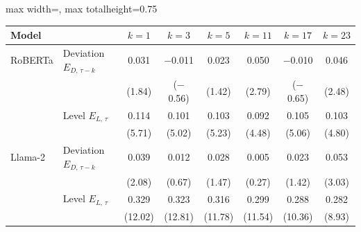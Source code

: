 \begin{table}[htbp]
{\footnotesize
\begin{adjustbox}{max width=\linewidth, max totalheight=0.75\textheight}
\begin{tabular}{llcccccc}
\toprule
Model &  & $k=1$ & $k=3$ & $k=5$ & $k=11$ & $k=17$ & $k=23$ \\
\midrule
RoBERTa & Deviation $E_{D,\,\tau-k}$ & \phantom{(0}0.031\phantom{)} & \phantom{(0}$-$0.011\phantom{)} & \phantom{(0}0.023\phantom{)} & \phantom{(0}0.050\phantom{)} & \phantom{(0}$-$0.010\phantom{)} & \phantom{(}0.046\phantom{)} \\
 &  & \phantom{0}(1.84)\phantom{0} & \phantom{0}($-$0.56)\phantom{0} & \phantom{0}(1.42)\phantom{0} & \phantom{0}(2.79)\phantom{0} & \phantom{0}($-$0.65)\phantom{0} & (2.48)\phantom{0} \\
 & Level $E_{L,\,\tau}$ & \phantom{(0}0.114\phantom{)} & \phantom{$-$(0}0.101\phantom{)} & \phantom{(0}0.103\phantom{)} & \phantom{(0}0.092\phantom{)} & \phantom{$-$(0}0.105\phantom{)} & \phantom{(}0.103\phantom{)} \\
 &  & \phantom{0}(5.71)\phantom{0} & \phantom{$-$0}(5.02)\phantom{0} & \phantom{0}(5.23)\phantom{0} & \phantom{0}(4.48)\phantom{0} & \phantom{$-$0}(5.06)\phantom{0} & (4.80)\phantom{0} \\
\midrule
Llama-2 & Deviation $E_{D,\,\tau-k}$ & \phantom{(0}0.039\phantom{)} & \phantom{$-$(0}0.012\phantom{)} & \phantom{(0}0.028\phantom{)} & \phantom{(0}0.005\phantom{)} & \phantom{$-$(0}0.023\phantom{)} & \phantom{(}0.053\phantom{)} \\
 &  & \phantom{0}(2.08)\phantom{0} & \phantom{$-$0}(0.67)\phantom{0} & \phantom{0}(1.47)\phantom{0} & \phantom{0}(0.27)\phantom{0} & \phantom{$-$0}(1.42)\phantom{0} & (3.03)\phantom{0} \\
 & Level $E_{L,\,\tau}$ & \phantom{(0}0.329\phantom{)} & \phantom{$-$(0}0.323\phantom{)} & \phantom{(0}0.316\phantom{)} & \phantom{(0}0.299\phantom{)} & \phantom{$-$(0}0.288\phantom{)} & \phantom{(}0.282\phantom{)} \\
 &  & (12.02)\phantom{0} & \phantom{$-$}(12.81)\phantom{0} & (11.78)\phantom{0} & (11.54)\phantom{0} & \phantom{$-$}(10.36)\phantom{0} & (8.93)\phantom{0} \\
\bottomrule
\end{tabular}
\end{adjustbox}
}
\end{table}
